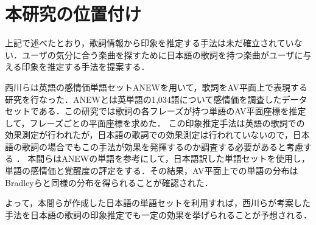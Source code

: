 \section{本研究の位置付け}
上記で述べたとおり，歌詞情報から印象を推定する手法は未だ確立されていない．ユーザの気分に合う楽曲を探すために日本語の歌詞を持つ楽曲がユーザに与える印象を推定する手法を提案する．

西川らは英語の感情価単語セットANEW\cite{11}を用いて，歌詞をAV平面上で表現する研究を行なった．ANEWとは英単語の1,034語について感情価を調査したデータセットである．この研究では歌詞の各フレーズが持つ単語のAV平面座標を推定して，フレーズごとの平面座標を求めた．
この印象推定手法は英語の歌詞での効果測定が行われたが，日本語の歌詞での効果測定は行われていないので，日本語の歌詞の場合でもこの手法が効果を発揮するのか調査する必要があると考慮する
．
本間ら\cite{12}はANEWの単語を参考にして，日本語訳した単語セットを使用し，単語の感情価と覚醒度の評定をする．その結果，AV平面上での単語の分布はBradleyらと同様の分布を得られることが確認された．

よって，本間らが作成した日本語の単語セットを利用すれば，西川らが考案した手法を日本語の歌詞の印象推定でも一定の効果を挙げられることが予想される．
